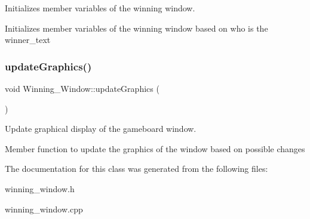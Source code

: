 Initializes member variables of the winning window. 

Initializes member variables of the winning window based on who is the winner_text \mbox{\label{classWinning__Window_a6daa7eec7198015a1f154cc9cb9b22c5}}
\subsubsection{\texorpdfstring{update\+Graphics()}{updateGraphics()}}
{\footnotesize\ttfamily void Winning\+\_\+\+Window\+::update\+Graphics (\begin{DoxyParamCaption}{ }\end{DoxyParamCaption})}



Update graphical display of the gameboard window. 

Member function to update the graphics of the window based on possible changes 

The documentation for this class was generated from the following files\+:\begin{DoxyCompactItemize}
\item 
winning\+\_\+window.\+h\item 
winning\+\_\+window.\+cpp\end{DoxyCompactItemize}
